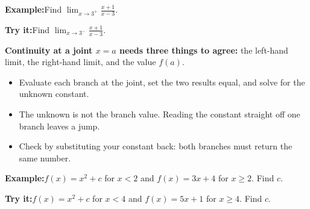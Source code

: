 \documentclass[12pt]{article}
\begin{document}
\begin{examplebox}
\textbf{Example:}\quad Find $\displaystyle\lim_{x \to 3^{+}} \frac{x + 1}{x - 3}$.
\end{examplebox}

\begin{tryitbox}
\textbf{Try it:}\quad Find $\displaystyle\lim_{x \to 3^{-}} \frac{x + 1}{x - 3}$.\\[2pt]
\end{tryitbox}


\begin{formulabox}
\textbf{Continuity at a joint $x = a$ needs three things to agree:} the left-hand limit, the right-hand limit, and the value $f(a)$.
\begin{itemize}[leftmargin=0.8cm, itemsep=0pt, topsep=1pt]
  \item Evaluate each branch at the joint, set the two results equal, and solve for the unknown constant.
  \item The unknown is not the branch value. Reading the constant straight off one branch leaves a jump.
  \item Check by substituting your constant back: both branches must return the same number.
\end{itemize}
\end{formulabox}

\begin{examplebox}
\textbf{Example:}\quad $f(x) = x^2 + c$ for $x < 2$ and $f(x) = 3x + 4$ for $x \ge 2$. Find $c$.
\end{examplebox}

\begin{tryitbox}
\textbf{Try it:}\quad $f(x) = x^2 + c$ for $x < 4$ and $f(x) = 5x + 1$ for $x \ge 4$. Find $c$.\\[2pt]
\end{tryitbox}
\end{document}
